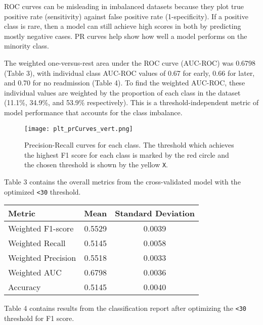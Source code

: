 \documentclass{article}      %
\begin{document}
ROC curves can be misleading in imbalanced datasets because they plot true positive rate (sensitivity) against false positive rate (1-specificity). If a positive class is rare, then a model can still achieve high scores in both by predicting mostly negative cases. PR curves help show how well a model performs on the minority class.

The weighted one-versus-rest area under the ROC curve (AUC-ROC) was 0.6798 (Table 3), with individual class AUC-ROC values 
of 0.67 for early, 0.66 for later, and 0.70 for no readmission (Table 4). To find the weighted AUC-ROC, these 
individual values are weighted by the proportion of each class in the dataset (11.1\%, 34.9\%, and 53.9\% respectively). This is a 
threshold-independent metric of model performance that accounts for the class imbalance.

\begin{figure}[h]
    \centering
    \texttt{[image: plt\_prCurves\_vert.png]}
    \caption{Precision-Recall curves for each class. The threshold which achieves the highest F1 score for each class is marked by the red circle and the chosen threshold is shown by the yellow \texttt{X}.}
    \label{fig:prCurves}
\end{figure}

\FloatBarrier
Table 3 contains the overall metrics from the cross-validated model with the optimized \texttt{\textless 30} threshold.

\begin{table}[h!]
    \centering
    \begin{tabular}{|l|c|c|}
    \hline
    \textbf{Metric} & \textbf{Mean} & \textbf{Standard Deviation} \\ \hline
    Weighted F1-score & 0.5529 & 0.0039 \\ \hline
    Weighted Recall & 0.5145 & 0.0058 \\ \hline
    Weighted Precision & 0.5518 & 0.0033 \\ \hline
    Weighted AUC & 0.6798 & 0.0036 \\ \hline
    Accuracy & 0.5145 & 0.0040 \\ \hline
    \end{tabular}
    \label{table:overall_metrics}
\end{table}

\FloatBarrier
Table 4 contains results from the classification report after optimizing the \texttt{\textless 30} threshold for F1 score.
\end{document}
